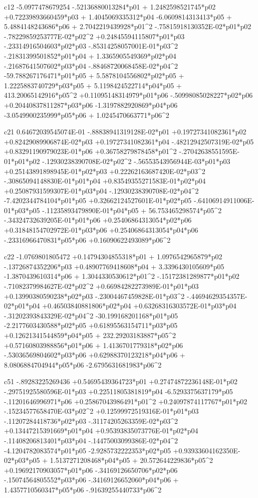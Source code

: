  c12
  -5.0977478679254  -.52136880013284*p01 + 1.2482598521745*p02 +0.72239893660459*p03 + 1.4045069335312*p04  -6.0609814313413*p05 + 5.4884148243686*p06 + 2.7042219439928*p01^2  -.75815918130352E-02*p01*p02  -.78229859253777E-02*p02^2 +0.24845594115807*p01*p03  -.23314916504603*p02*p03  -.85314258057001E-01*p03^2  -.21831399501852*p01*p04 + 1.3365905549369*p02*p04  -.21687641507602*p03*p04  -.88468720068458E-02*p04^2  -59.788267176471*p01*p05 + 5.5878104556802*p02*p05 + 1.2225883740729*p03*p05 + 5.1198424522714*p04*p05 + 413.20065142916*p05^2 +0.11095148314979*p01*p06  -.50998085028227*p02*p06 +0.20440837811287*p03*p06  -1.3197882920869*p04*p06  -3.0549900235999*p05*p06 + 1.0245470663771*p06^2 
  
 c21
  0.64672039545074E-01  -.88838941319128E-02*p01 +0.19727341082361*p02 +0.82429089906874E-02*p03 +0.19727341082361*p04  -.48212942507319E-02*p05 +0.83291190979023E-01*p06 +0.36758279878458*p01^2  -.27042638551595E-01*p01*p02  -.12930238390708E-02*p02^2  -.56553543956944E-03*p01*p03 +0.25143891898945E-01*p02*p03 +0.22262163687420E-02*p03^2  -.30865094148830E-01*p01*p04 +0.83549355271583E-01*p02*p04 +0.25087931599307E-01*p03*p04  -.12930238390708E-02*p04^2  -7.4202344784104*p01*p05 +0.32662124527601E-01*p02*p05  -.64106914911006E-01*p03*p05  -.11235893479890E-01*p04*p05 + 56.753465298574*p05^2  -.34324732639205E-01*p01*p06 +0.25406864313054*p02*p06 +0.31848154702972E-01*p03*p06 +0.25406864313054*p04*p06  -.23316966470831*p05*p06 +0.16090622493089*p06^2 
  
 c22
  -1.0769801805472 +0.14794304855318*p01 + 1.0976542965879*p02  -.13726874352206*p03 +0.48907769418608*p04 + 3.3396430105609*p05  -1.3870439610314*p06 + 1.3044330530612*p01^2  -.15172381289877*p01*p02  -.71082379984627E-02*p02^2 +0.66984282273989E-01*p01*p03 +0.13990380590238*p02*p03  -.23004467459828E-01*p03^2  -.44694629354357E-02*p01*p04 +0.46503840881806*p02*p04 +0.63268316303572E-01*p03*p04  -.31202393843329E-02*p04^2  -30.199168201168*p01*p05  -2.2177603430588*p02*p05 +0.61895563154711*p03*p05 +0.12621341544859*p04*p05 + 232.29203183887*p05^2 +0.57160803988856*p01*p06 + 1.4136701779318*p02*p06  -.53036569804602*p03*p06 +0.62988370123218*p04*p06 + 8.0806884704944*p05*p06  -2.6795631681983*p06^2 
  
 c51
  -.89283225269436 +0.54695439364723*p01 +0.27474872236148E-01*p02  -.29751925580596E-01*p03 +0.22511805381819*p04  -6.5293375637179*p05  -.11201646996971*p06 +0.25867043986491*p01^2 +0.24097874117767*p01*p02  -.15234577658470E-03*p02^2 +0.12599972519316E-01*p01*p03  -.11207284418736*p02*p03  -.31174205263359E-02*p03^2 +0.13447215391669*p01*p04 +0.95393835073776E-01*p02*p04  -.11408206813401*p03*p04  -.14475003099386E-02*p04^2  -4.1204782083574*p01*p05  -2.9285732222353*p02*p05 +0.93933604162350E-02*p03*p05 + 1.5137271208468*p04*p05 + 20.572644229836*p05^2 +0.19692170903057*p01*p06  -.34169126650706*p02*p06  -.15074564805552*p03*p06  -.34169126652060*p04*p06 + 1.4357710560347*p05*p06  -.91639255440733*p06^2 
  
